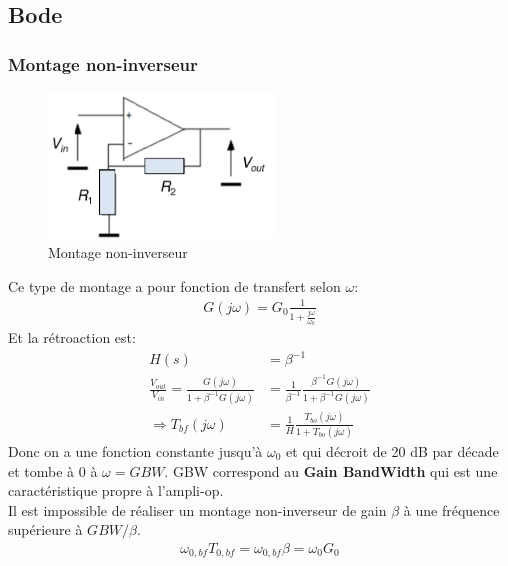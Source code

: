 \documentclass{report}
\begin{document}
\subsection{Bode}
\subsubsection{Montage non-inverseur}
\begin{figure}
\centering
\includegraphics[width=6cm]{img/nonInv.png}
\caption{Montage non-inverseur}
\end{figure}
Ce type de montage a pour fonction de transfert selon $\omega$:
\begin{align*}
G(j \omega) = G_0 \frac{1}{1 + \frac{j\omega}{\omega_0}}
\end{align*}
Et la rétroaction est:
\begin{align*}
H(s) &= \beta^{-1}\\
\frac{V_{out}}{V_{in}} = \frac{G(j\omega)}{1 + \beta^{-1} G(j \omega)} &= \frac{1}{\beta^{-1}} \frac{\beta^{-1}G(j\omega)}{1 + \beta^{-1} G(j \omega)}\\
\Rightarrow T_{bf}(j \omega) &= \frac{1}{H} \frac{T_{bo}(j \omega)}{1 + T_{bo} (j \omega)}
\end{align*}
Donc on a une fonction constante jusqu'à $\omega_0$ et qui décroit de 20 dB par décade et tombe à 0 à $\omega = GBW$. GBW correspond au \textbf{Gain BandWidth} qui est une caractéristique propre à l'ampli-op.\\
Il est impossible de réaliser un montage non-inverseur de gain $\beta$ à une fréquence supérieure à $GBW/\beta$.
\begin{align*}
\omega_{0, bf} T_{0,bf} = \omega_{0, bf} \beta = \omega_0 G_0
\end{align*}
\end{document}
